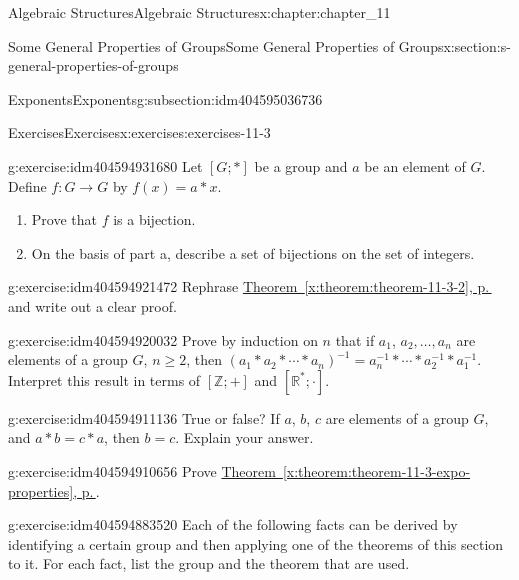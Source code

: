 \documentclass[twoside,10pt,]{book}
\newcommand{\xreffont}{\relax}
\numberwithin{equation}{section}
\begin{document}
\begin{chapterptx}{Algebraic Structures}{}{Algebraic Structures}{}{}{x:chapter:chapter_11}
\begin{sectionptx}{Some General Properties of Groups}{}{Some General Properties of Groups}{}{}{x:section:s-general-properties-of-groups}
\begin{subsectionptx}{Exponents}{}{Exponents}{}{}{g:subsection:idm404595036736}
\begin{itemize}[label=\textbullet]
\end{itemize}
%
\end{subsectionptx}
%
%
\typeout{************************************************}
\typeout{************************************************}
%
\begin{exercises-subsection}{Exercises}{}{Exercises}{}{}{x:exercises:exercises-11-3}
\begin{divisionexercise}{1}{}{}{g:exercise:idm404594931680}%
Let \([G; * ]\) be a group and \(a\) be an element of \(G\).  Define \(f:G \to  G\) by \(f(x) = a * x\).%
\begin{enumerate}[label=(\alph*)]
\item{}Prove that \(f\) is a bijection.%
\item{}On the basis of part a, describe a set of bijections on the set of integers.%
\end{enumerate}
%
\end{divisionexercise}%
\begin{divisionexercise}{2}{}{}{g:exercise:idm404594921472}%
Rephrase \hyperref[x:theorem:theorem-11-3-2]{Theorem~{\xreffont\ref{x:theorem:theorem-11-3-2}}, p.\,\pageref{x:theorem:theorem-11-3-2}} and write out a clear proof.%
\end{divisionexercise}%
\begin{divisionexercise}{3}{}{}{g:exercise:idm404594920032}%
Prove by induction on \(n\) that if \(a_1\), \(a_2,\ldots , a_n\) are elements of a group \(G\), \(n\geq 2\), then \(\left(a_1*a_2*\cdots *a_n\right)^{-1}= a_n^{-1}*\cdots *a_2^{-1}*a_1^{-1}\). Interpret this result in terms of \([\mathbb{Z}; +]\) and \([\mathbb{R}^*;\cdot]\).%
\end{divisionexercise}%
\begin{divisionexercise}{4}{}{}{g:exercise:idm404594911136}%
True or false? If \(a\), \(b\), \(c\) are elements of a group \(G\), and \(a * b = c * a\), then \(b = c\). Explain your answer.%
\end{divisionexercise}%
\begin{divisionexercise}{5}{}{}{g:exercise:idm404594910656}%
Prove \hyperref[x:theorem:theorem-11-3-expo-properties]{Theorem~{\xreffont\ref{x:theorem:theorem-11-3-expo-properties}}, p.\,\pageref{x:theorem:theorem-11-3-expo-properties}}.%
\end{divisionexercise}%
\begin{divisionexercise}{6}{}{}{g:exercise:idm404594883520}%
Each of the following facts can be derived by identifying a certain group and then applying one of the theorems of this section to it. For each fact, list the group and the theorem that are used.%

\end{divisionexercise}
\end{exercises-subsection}
\end{sectionptx}
\end{chapterptx}
\end{document}
